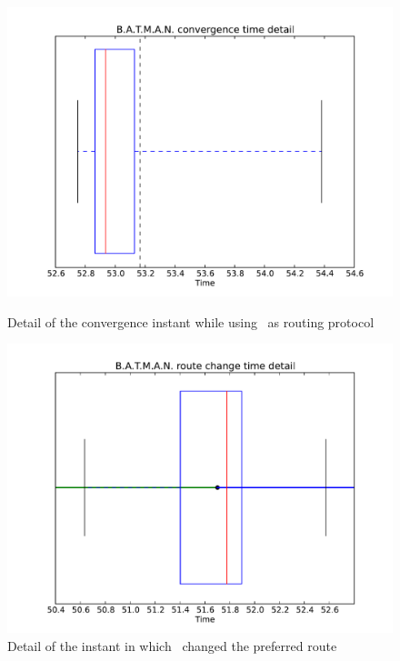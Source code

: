 \begin{figure}[bhtp]
  \begin{minipage}[b]{0.5\linewidth}
    \centering
    \includegraphics[width=\linewidth]{images/convergence_batman_plot_convergence_time}
    \caption{Detail of the convergence instant while using \batman\ as routing protocol}
    \label{pic:batman_convergence_time}
  \end{minipage}
  \hspace{0.5cm}
  \begin{minipage}[b]{0.5\linewidth}
    \centering
    \includegraphics[width=\linewidth]{images/convergence_batman_plot_nexthop_change}
    \caption{Detail of the instant in which \batman\ changed the
                 preferred route}
    \label{pic:batman_convergence_change}
  \end{minipage}
\end{figure}


